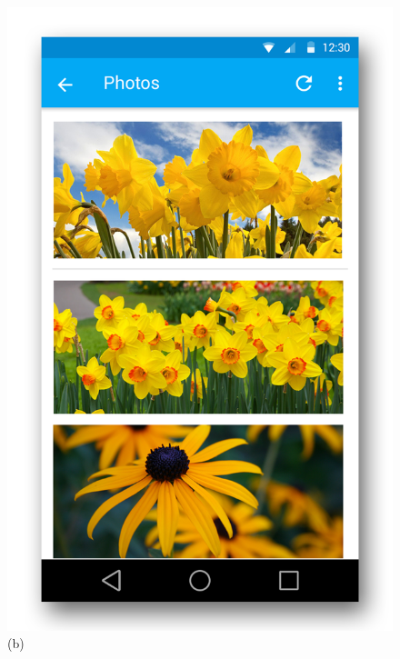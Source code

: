 \documentclass[11pt, a4paper]{report}
\begin{document}
\begin{figure}[h]
\begin{minipage}[b]{0.2\linewidth}
	\includegraphics[totalheight=6cm]{img/05.png}
	(b)
\end{minipage}
\begin{minipage}[b]{0.2\linewidth}
	\centering

\end{minipage}
\end{figure}
\end{document}
